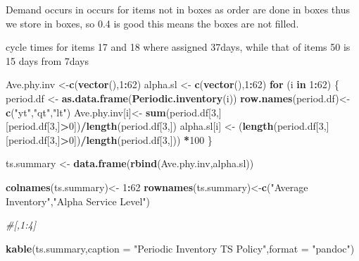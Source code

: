 \documentclass[
]{article}
\newenvironment{Shaded}{\begin{snugshade}}{\end{snugshade}}
\newcommand{\CommentTok}[1]{\textcolor[rgb]{0.56,0.35,0.01}{\textit{#1}}}
\newcommand{\ControlFlowTok}[1]{\textcolor[rgb]{0.13,0.29,0.53}{\textbf{#1}}}
\newcommand{\DataTypeTok}[1]{\textcolor[rgb]{0.13,0.29,0.53}{#1}}
\newcommand{\DecValTok}[1]{\textcolor[rgb]{0.00,0.00,0.81}{#1}}
\newcommand{\KeywordTok}[1]{\textcolor[rgb]{0.13,0.29,0.53}{\textbf{#1}}}
\newcommand{\NormalTok}[1]{#1}
\newcommand{\OperatorTok}[1]{\textcolor[rgb]{0.81,0.36,0.00}{\textbf{#1}}}
\newcommand{\StringTok}[1]{\textcolor[rgb]{0.31,0.60,0.02}{#1}}
\begin{document}
Demand occurs in occurs for items not in boxes as order are done in
boxes thus we store in boxes, so 0.4 is good this means the boxes are
not filled.

cycle times for items 17 and 18 where assigned 37days, while that of
items 50 is 15 days from 7days

\begin{Shaded}
\end{Shaded}

\begin{Shaded}
\begin{Highlighting}[]
\NormalTok{Ave.phy.inv <-}\KeywordTok{c}\NormalTok{(}\KeywordTok{vector}\NormalTok{(),}\DecValTok{1}\OperatorTok{:}\DecValTok{62}\NormalTok{)}
\NormalTok{alpha.sl <-}\StringTok{ }\KeywordTok{c}\NormalTok{(}\KeywordTok{vector}\NormalTok{(),}\DecValTok{1}\OperatorTok{:}\DecValTok{62}\NormalTok{)}
\ControlFlowTok{for}\NormalTok{ (i }\ControlFlowTok{in} \DecValTok{1}\OperatorTok{:}\DecValTok{62}\NormalTok{) \{}
\NormalTok{  period.df <-}\StringTok{ }\KeywordTok{as.data.frame}\NormalTok{(}\KeywordTok{Periodic.inventory}\NormalTok{(i))}
  \KeywordTok{row.names}\NormalTok{(period.df)<-}\StringTok{ }\KeywordTok{c}\NormalTok{(}\StringTok{"yt"}\NormalTok{,}\StringTok{"qt"}\NormalTok{,}\StringTok{"lt"}\NormalTok{)}
\NormalTok{  Ave.phy.inv[i]<-}\StringTok{ }\KeywordTok{sum}\NormalTok{(period.df[}\DecValTok{3}\NormalTok{,][period.df[}\DecValTok{3}\NormalTok{,]}\OperatorTok{>}\DecValTok{0}\NormalTok{])}\OperatorTok{/}\KeywordTok{length}\NormalTok{(period.df[}\DecValTok{3}\NormalTok{,])}
\NormalTok{  alpha.sl[i] <-}\StringTok{ }\NormalTok{(}\KeywordTok{length}\NormalTok{(period.df[}\DecValTok{3}\NormalTok{,][period.df[}\DecValTok{3}\NormalTok{,]}\OperatorTok{>}\DecValTok{0}\NormalTok{])}\OperatorTok{/}\KeywordTok{length}\NormalTok{(period.df[}\DecValTok{3}\NormalTok{,])) }\OperatorTok{*}\DecValTok{100}
\NormalTok{\}}

\NormalTok{ts.summary <-}\StringTok{ }\KeywordTok{data.frame}\NormalTok{(}\KeywordTok{rbind}\NormalTok{(Ave.phy.inv,alpha.sl))}

\KeywordTok{colnames}\NormalTok{(ts.summary)<-}\StringTok{ }\DecValTok{1}\OperatorTok{:}\DecValTok{62}
\KeywordTok{rownames}\NormalTok{(ts.summary)<-}\KeywordTok{c}\NormalTok{(}\StringTok{"Average Inventory"}\NormalTok{,}\StringTok{"Alpha Service Level"}\NormalTok{)}

\CommentTok{#[,1:4]}

\KeywordTok{kable}\NormalTok{(ts.summary,}\DataTypeTok{caption =} \StringTok{"Periodic Inventory TS Policy"}\NormalTok{,}\DataTypeTok{format =} \StringTok{"pandoc"}\NormalTok{)}
\end{Highlighting}
\end{Shaded}
\end{document}
